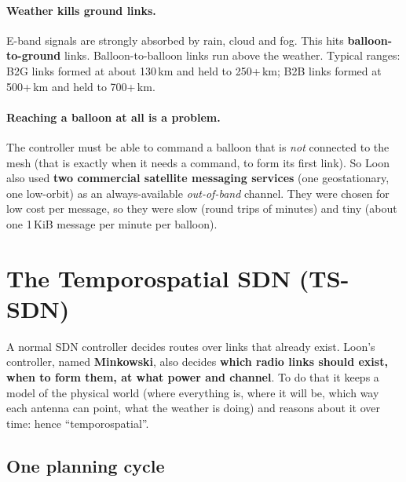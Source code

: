 \paragraph{Weather kills ground links.} E-band signals are strongly absorbed by rain, cloud and fog. This hits \textbf{balloon-to-ground} links. Balloon-to-balloon links
run above the weather. Typical ranges: B2G links formed at about 130\,km and held to 250+\,km; B2B links formed at 500+\,km and held to 700+\,km.

\paragraph{Reaching a balloon at all is a problem.} The controller must be able to command a balloon that is \emph{not} connected to the mesh (that is exactly when it needs a
command, to form its first link). So Loon also used \textbf{two commercial satellite messaging services} (one geostationary, one low-orbit) as an always-available
\emph{out-of-band} channel. They were chosen for low cost per message, so they were slow (round trips of minutes) and tiny (about one 1\,KiB message per minute per balloon).

\section{The Temporospatial SDN (TS-SDN)}


A normal SDN controller decides routes over links that already exist. Loon's controller, named \textbf{Minkowski}, also decides \textbf{which radio links should exist, when
to form them, at what power and channel}. To do that it keeps a model of the physical world (where everything is, where it will be, which way each antenna can point, what the
weather is doing) and reasons about it over time: hence ``temporospatial''.

\subsection{One planning cycle}

